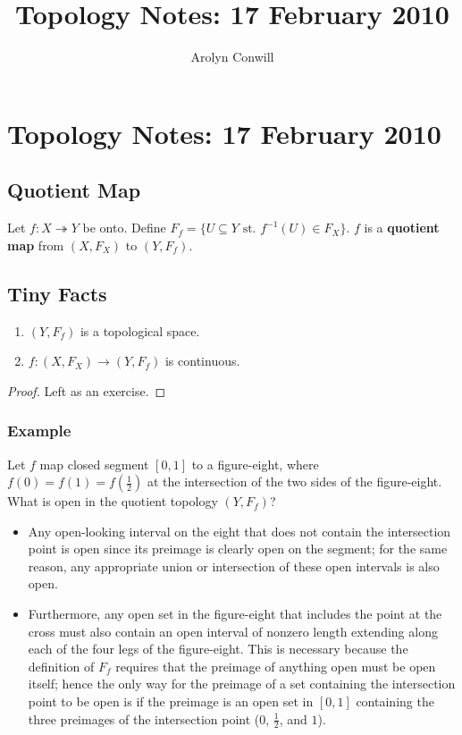 \documentclass[12pt]{amsart}
\title{Topology Notes: 17 February 2010}
\author{Arolyn Conwill}
\begin{document}
\section*{Topology Notes: 17 February 2010}

\subsection{Quotient Map} Let $f: X \twoheadrightarrow Y$ be onto. Define $F_f = \{ U \subseteq Y \text{ st. } f^{-1}(U) \in F_X \}$. $f$ is a \textbf{quotient map} from $(X,F_X)$ to $(Y,F_f)$.

\subsection{Tiny Facts}
\begin{enumerate}
	\item $(Y,F_f)$ is a topological space.
	\item $f: (X,F_X) \rightarrow (Y,F_f)$ is continuous. 
\end{enumerate}
\begin{proof} Left as an exercise. \end{proof}

\subsubsection{Example} Let $f$ map closed segment $[0,1]$ to a figure-eight, where $f(0)=f(1)=f(\frac{1}{2})$ at the intersection of the two sides of the figure-eight. What is open in the quotient topology $(Y,F_f)$? 
\vspace{2cm}
\begin{itemize}
	\item Any open-looking interval on the eight that does not contain the intersection point is open since its preimage is clearly open on the segment; for the same reason, any appropriate union or intersection of these open intervals is also open.
	\item Furthermore, any open set in the figure-eight that includes the point at the cross must also contain an open interval of nonzero length extending along each of the four legs of the figure-eight. This is necessary because the definition of $F_f$ requires that the preimage of anything open must be open itself; hence the only way for the preimage of a set containing the intersection point to be open is if the preimage is an open set in $[0,1]$ containing the three preimages of the intersection point ($0$, $\frac{1}{2}$, and $1$).
\end{itemize}
\end{document}
